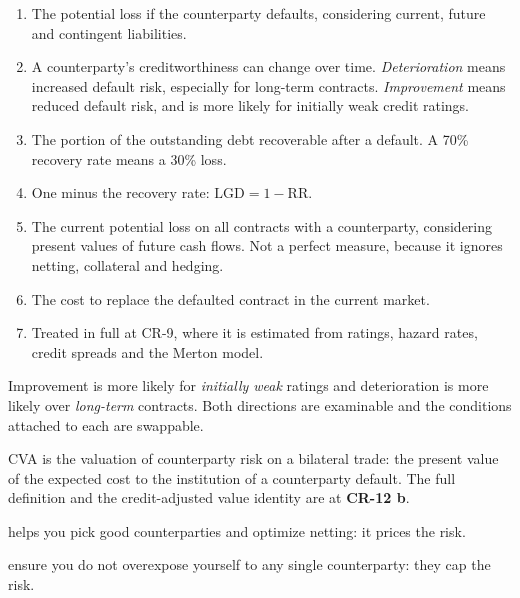 \begin{enumerate}
\item {} The potential loss if the counterparty defaults,
considering current, future and contingent liabilities.
\item {} A counterparty's creditworthiness can change over
time. \emph{Deterioration} means increased default risk, especially for long-term
contracts. \emph{Improvement} means reduced default risk, and is more likely for
initially weak credit ratings.
\item {} The portion of the outstanding debt recoverable after
a default. A 70\% recovery rate means a 30\% loss.
\item {} One minus the recovery rate:
$\mathrm{LGD} = 1 - \mathrm{RR}$.
\item {} The current potential loss on all contracts
with a counterparty, considering present values of future cash flows. Not a
perfect measure, because it ignores netting, collateral and hedging.
\item {} The cost to replace the defaulted contract in the
current market.
\item {} Treated in full at CR-9, where it is estimated
from ratings, hazard rates, credit spreads and the Merton model.
\end{enumerate}

\begin{crtrapbox}
Improvement is more likely for \emph{initially weak} ratings and deterioration is
more likely over \emph{long-term} contracts. Both directions are examinable and
the conditions attached to each are swappable.
\end{crtrapbox}


CVA is the valuation of counterparty risk on a bilateral trade: the present value
of the expected cost to the institution of a counterparty default. The full
definition and the credit-adjusted value identity are at \textbf{CR-12 b}.

\begin{crkeybox}
 helps you pick good counterparties and optimize netting: it prices the
risk.

\smallskip
{} ensure you do not overexpose yourself to any single
counterparty: they cap the risk.
\end{crkeybox}

